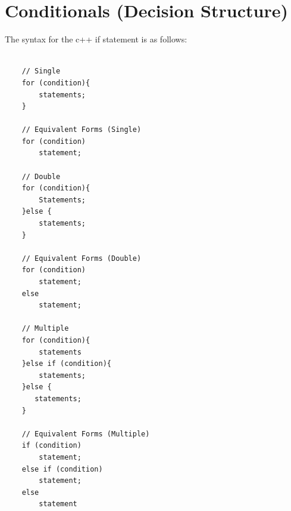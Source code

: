 \documentclass{report}
\begin{document}
    \pagebreak \bigbreak \noindent 
    \section{\LARGE Conditionals (Decision Structure)}
    \bigbreak \noindent 
    The syntax for the c++ if statement is as follows:
    \smallbreak \noindent
    \sepline
    \begin{verbatim}

    // Single
    for (condition){
        statements;
    }

    // Equivalent Forms (Single)
    for (condition)
        statement;

    // Double
    for (condition){
        Statements;
    }else {
        statements;
    }

    // Equivalent Forms (Double)
    for (condition)
        statement;
    else 
        statement;

    // Multiple
    for (condition){
        statements
    }else if (condition){
        statements;
    }else {
       statements; 
    }

    // Equivalent Forms (Multiple)
    if (condition)
        statement;
    else if (condition)
        statement;
    else 
        statement

    \end{verbatim}
    \sepline

    \bigbreak \noindent 

    \pagebreak \bigbreak \noindent 
\end{document}
